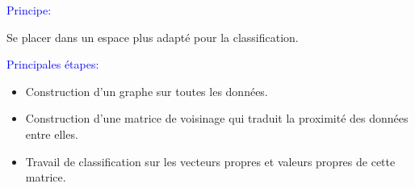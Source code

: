 \documentclass{beamer}
\begin{document}
\begin{frame}

\textcolor{blue}{Principe:}

\medskip
Se placer dans un espace plus adapté pour la classification.

\medskip

\textcolor{blue}{Principales étapes:}

\begin{itemize}
\item Construction d'un graphe sur toutes les données.
\item Construction d'une matrice de voisinage qui traduit la proximité des données entre elles.
\item Travail de classification sur les vecteurs propres et valeurs propres de cette matrice.
\end{itemize}

\end{frame}
\end{document}
